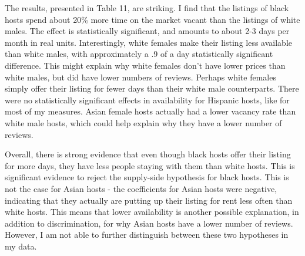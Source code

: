 The results, presented in Table 11, are striking. I find that the listings of black hosts spend about 20\% more time on the market vacant than the listings of white males. The effect is statistically significant, and amounts to about 2-3 days per month in real units. Interestingly, white females make their listing less available than white males, with approximately a .9 of a day statistically significant difference. This might explain why white females don't have lower prices than white males, but did have lower numbers of reviews. Perhaps white females simply offer their listing for fewer days than their white male counterparts. There were no statistically significant effects in availability for Hispanic hosts, like for most of my measures. Asian female hosts actually had a lower vacancy rate than white male hosts, which could help explain why they have a lower number of reviews. 

Overall, there is strong evidence that even though black hosts offer their listing for more days, they have less people staying with them than white hosts. This is significant evidence to reject the supply-side hypothesis for black hosts. This is not the case for Asian hosts - the coefficients for Asian hosts were negative, indicating that they actually are putting up their listing for rent less often than white hosts. This means that lower availability is another possible explanation, in addition to discrimination, for why Asian hosts have a lower number of reviews. However, I am not able to further distinguish between these two hypotheses in my data.  
